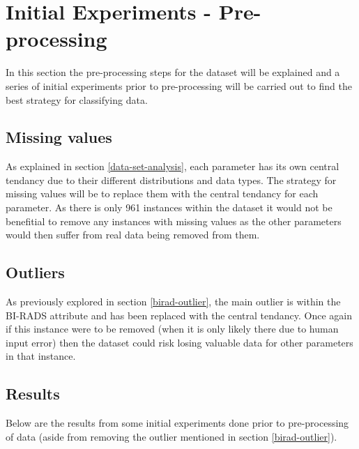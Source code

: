 \documentclass[12pt]{article}
\begin{document}
\section{Initial Experiments - Pre-processing}
  In this section the pre-processing steps for the dataset will be explained and a series of initial experiments prior to pre-processing will be carried out to find the best strategy for classifying data.

  \subsection{Missing values}
    As explained in section \ref{data-set-analysis}, each parameter has its own central tendancy due to their different distributions and data types. The strategy for missing values will be to replace them with the central tendancy for each parameter. As there is only 961 instances within the dataset it would not be benefitial to remove any instances with missing values as the other parameters would then suffer from real data being removed from them.

  \subsection{Outliers}
    As previously explored in section \ref{birad-outlier}, the main outlier is within the BI-RADS attribute and has been replaced with the central tendancy. Once again if this instance were to be removed (when it is only likely there due to human input error) then the dataset could risk losing valuable data for other parameters in that instance.

  \subsection{Results}
    Below are the results from some initial experiments done prior to pre-processing of data (aside from removing the outlier mentioned in section \ref{birad-outlier}).
\end{document}
